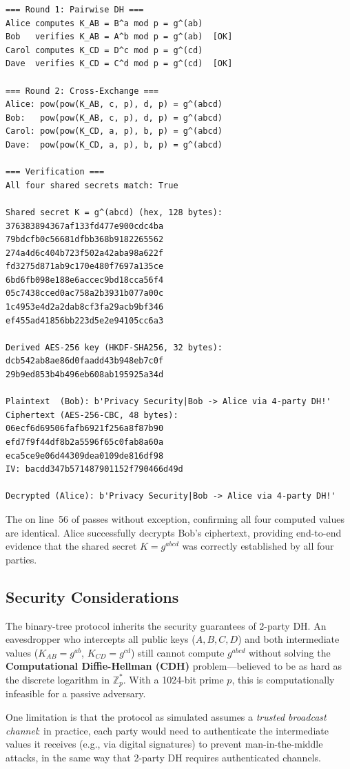 \documentclass[twocolumn, 10pt]{article}
\begin{document}
\begin{tcolorbox}[breakable, colback=gray!5, colframe=gray!50, arc=0pt, boxrule=0.5pt, left=5pt, right=5pt, top=5pt, bottom=5pt]
\begin{lstlisting}[language={}, basicstyle=\fontsize{7}{8}\ttfamily, breaklines=true, breakatwhitespace=false, columns=fixed]
=== Round 1: Pairwise DH ===
Alice computes K_AB = B^a mod p = g^(ab)
Bob   verifies K_AB = A^b mod p = g^(ab)  [OK]
Carol computes K_CD = D^c mod p = g^(cd)
Dave  verifies K_CD = C^d mod p = g^(cd)  [OK]

=== Round 2: Cross-Exchange ===
Alice: pow(pow(K_AB, c, p), d, p) = g^(abcd)
Bob:   pow(pow(K_AB, c, p), d, p) = g^(abcd)
Carol: pow(pow(K_CD, a, p), b, p) = g^(abcd)
Dave:  pow(pow(K_CD, a, p), b, p) = g^(abcd)

=== Verification ===
All four shared secrets match: True

Shared secret K = g^(abcd) (hex, 128 bytes):
376383894367af133fd477e900cdc4ba
79bdcfb0c56681dfbb368b9182265562
274a4d6c404b723f502a42aba98a622f
fd3275d871ab9c170e480f7697a135ce
6bd6fb098e188e6accec9bd18cca56f4
05c7438cced0ac758a2b3931b077a00c
1c4953e4d2a2dab8cf3fa29acb9bf346
ef455ad41856bb223d5e2e94105cc6a3

Derived AES-256 key (HKDF-SHA256, 32 bytes):
dcb542ab8ae86d0faadd43b948eb7c0f
29b9ed853b4b496eb608ab195925a34d

Plaintext  (Bob): b'Privacy Security|Bob -> Alice via 4-party DH!'
Ciphertext (AES-256-CBC, 48 bytes):
06ecf6d69506fafb6921f256a8f87b90
efd7f9f44df8b2a5596f65c0fab8a60a
eca5ce9e06d44309dea0109de816df98
IV: bacdd347b571487901152f790466d49d

Decrypted (Alice): b'Privacy Security|Bob -> Alice via 4-party DH!'
\end{lstlisting}
\end{tcolorbox}

The  on line~56 of  passes without exception, confirming all four computed values are identical. Alice successfully decrypts Bob's ciphertext, providing end-to-end evidence that the shared secret $K = g^{abcd}$ was correctly established by all four parties.

\subsection{Security Considerations}

The binary-tree protocol inherits the security guarantees of 2-party DH. An eavesdropper who intercepts all public keys ($A, B, C, D$) and both intermediate values ($K_{AB} = g^{ab}$, $K_{CD} = g^{cd}$) still cannot compute $g^{abcd}$ without solving the \textbf{Computational Diffie-Hellman (CDH)} problem---believed to be as hard as the discrete logarithm in $\mathbb{Z}_p^*$. With a 1024-bit prime $p$, this is computationally infeasible for a passive adversary.

One limitation is that the protocol as simulated assumes a \emph{trusted broadcast channel}: in practice, each party would need to authenticate the intermediate values it receives (e.g., via digital signatures) to prevent man-in-the-middle attacks, in the same way that 2-party DH requires authenticated channels.
\end{document}
